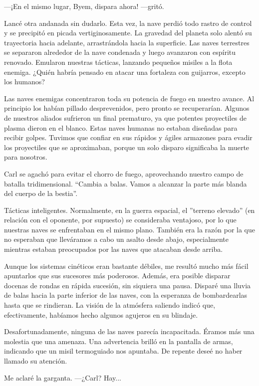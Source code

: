 —¡En el mismo lugar, Byem, dispara ahora! —gritó.

Lancé otra andanada sin dudarlo. Esta vez, la nave perdió todo rastro de control y se precipitó en picada vertiginosamente. La gravedad del planeta solo alentó su trayectoria hacia adelante, arrastrándola hacia la superficie. Las naves terrestres se separaron alrededor de la nave condenada y luego avanzaron con espíritu renovado. Emularon nuestras tácticas, lanzando pequeños misiles a la flota enemiga. ¿Quién habría pensado en atacar una fortaleza con guijarros, excepto los humanos?

Las naves enemigas concentraron toda su potencia de fuego en nuestro avance. Al principio los habían pillado desprevenidos, pero pronto se recuperarían. Algunos de nuestros aliados sufrieron un final prematuro, ya que potentes proyectiles de plasma dieron en el blanco. Estas naves humanas no estaban diseñadas para recibir golpes. Tuvimos que confiar en sus rápidos y ágiles armazones para evadir los proyectiles que se aproximaban, porque un solo disparo significaba la muerte para nosotros.

Carl se agachó para evitar el chorro de fuego, aprovechando nuestro campo de batalla tridimensional. ``Cambia a balas. Vamos a alcanzar la parte más blanda del cuerpo de la bestia''.

Tácticas inteligentes. Normalmente, en la guerra espacial, el ''terreno elevado'' (en relación con el oponente, por supuesto) se consideraba ventajoso, por lo que nuestras naves se enfrentaban en el mismo plano. También era la razón por la que no esperaban que lleváramos a cabo un asalto desde abajo, especialmente mientras estaban preocupados por las naves que atacaban desde arriba.

Aunque los sistemas cinéticos eran bastante débiles, me resultó mucho más fácil apuntarlos que sus sucesores más poderosos. Además, era posible disparar docenas de rondas en rápida sucesión, sin siquiera una pausa. Disparé una lluvia de balas hacia la parte inferior de las naves, con la esperanza de bombardearlas hasta que se rindieran. La visión de la atmósfera saliendo indicó que, efectivamente, habíamos hecho algunos agujeros en su blindaje.

Desafortunadamente, ninguna de las naves parecía incapacitada. Éramos más una molestia que una amenaza. Una advertencia brilló en la pantalla de armas, indicando que un misil termoguiado nos apuntaba. De repente deseé no haber llamado su atención.

Me aclaré la garganta. —¿Carl? Hay...


